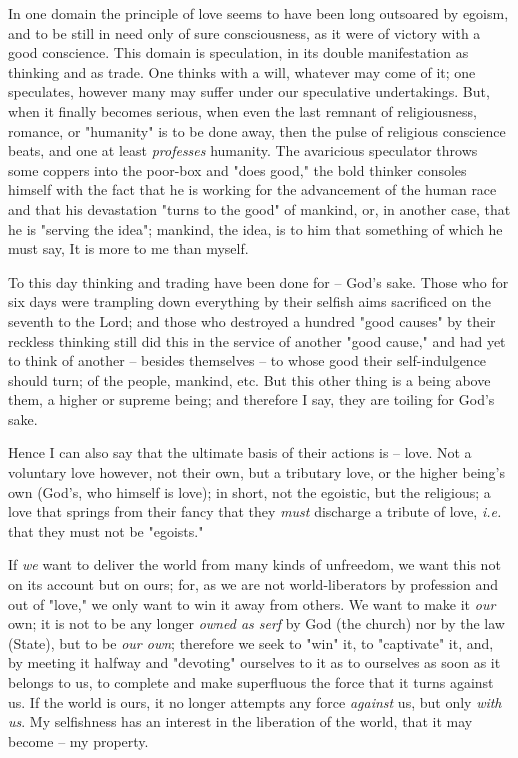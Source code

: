 \documentclass[a4paper]{book}
\begin{document}
In one domain the principle of love seems to have been long outsoared by 
egoism, and to be still in need only of sure consciousness, as it were of 
victory with a good conscience. This domain is speculation, in its double 
manifestation as thinking and as trade. One thinks with a will, whatever may 
come of it; one speculates, however many may suffer under our speculative 
undertakings. But, when it finally becomes serious, when even the last remnant 
of religiousness, romance, or "{}humanity"{} is to be done away, then the 
pulse of religious conscience beats, and one at least \textit{professes} 
humanity. The avaricious speculator throws some coppers into the poor-box and 
"{}does good,"{} the bold thinker consoles himself with the fact that he is 
working for the advancement of the human race and that his devastation 
"{}turns to the good"{} of mankind, or, in another case, that he is "{}serving 
the idea"{}; mankind, the idea, is to him that something of which he must say, 
It is more to me than myself.

To this day thinking and trading have been done for -- God's sake. Those who 
for six days were trampling down everything by their selfish aims sacrificed 
on the seventh to the Lord; and those who destroyed a hundred "{}good 
causes"{} by their reckless thinking still did this in the service of another 
"{}good cause,"{} and had yet to think of another -- besides themselves -- to 
whose good their self-indulgence should turn; of the people, mankind, etc. But 
this other thing is a being above them, a higher or supreme being; and 
therefore I say, they are toiling for God's sake.

Hence I can also say that the ultimate basis of their actions is -- love. Not 
a voluntary love however, not their own, but a tributary love, or the higher 
being's own (God's, who himself is love); in short, not the egoistic, but the 
religious; a love that springs from their fancy that they \textit{must} 
discharge a tribute of love, \textit{i.e.} that they must not be 
"{}egoists."{}

If \textit{we} want to deliver the world from many kinds of unfreedom, we want 
this not on its account but on ours; for, as we are not world-liberators by 
profession and out of "{}love,"{} we only want to win it away from others. We 
want to make it \textit{our} own; it is not to be any longer \textit{owned as 
serf} by God (the church) nor by the law (State), but to be \textit{our own}; 
therefore we seek to "{}win"{} it, to "{}captivate"{} it, and, by meeting it 
halfway and "{}devoting"{} ourselves to it as to ourselves as soon as it 
belongs to us, to complete and make superfluous the force that it turns 
against us. If the world is ours, it no longer attempts any force 
\textit{against} us, but only \textit{with us}. My selfishness has an interest 
in the liberation of the world, that it may become -- my property.
\end{document}
